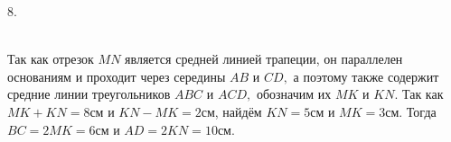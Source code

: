 8. \begin{figure}[ht!]
\end{figure}\\
Так как отрезок $MN$ является средней линией трапеции, он параллелен основаниям и проходит через середины $AB$ и $CD,$ а поэтому также содержит средние линии треугольников $ABC$ и $ACD,$ обозначим их $MK$ и $KN.$ Так как $MK+KN=8$см и $KN-MK=2$см, найдём $KN=5$см и $MK=3$см. Тогда $BC=2MK=6$см и $AD=2KN=10$см.\\
